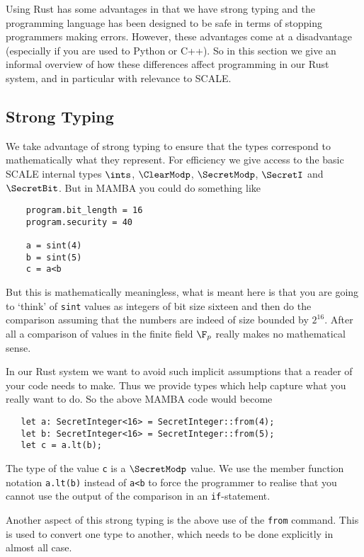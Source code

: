 Using Rust has some advantages in that we have strong typing and the
programming language has been designed to be safe in terms of stopping
programmers making errors.
However, these advantages come at a disadvantage (especially if you 
are used to Python or C++). 
So in this section we give an informal overview of how these differences
affect programming in our Rust system, and in particular with relevance
to SCALE.

\subsection{Strong Typing}
We take advantage of strong typing to ensure that the types correspond
to mathematically what they represent.
For efficiency we give access to the basic SCALE internal types
$\ints$, $\ClearModp$, $\SecretModp$, $\SecretI$ and $\SecretBit$.
But in MAMBA you could do something like
\begin{lstlisting}
    program.bit_length = 16
    program.security = 40

    a = sint(4)
    b = sint(5)
    c = a<b
\end{lstlisting}
But this is mathematically meaningless, what is meant here is that
you are going to `think' of \verb|sint| values as integers of bit
size sixteen and then do the comparison assuming that the numbers
are indeed of size bounded by $2^{16}$. After all a comparison
of values in the finite field $\F_p$ really makes no mathematical
sense.

In our Rust system we want to avoid such implicit assumptions
that a reader of your code needs to make. Thus we provide types
which help capture what you really want to do.
So the above MAMBA code would become
\begin{lstlisting}
   let a: SecretInteger<16> = SecretInteger::from(4);
   let b: SecretInteger<16> = SecretInteger::from(5);
   let c = a.lt(b);
\end{lstlisting}
The type of the value \verb|c| is a $\SecretModp$ value.
We use the member function notation \verb|a.lt(b)| instead
of \verb|a<b| to force the programmer to realise that you cannot
use the output of the comparison in an \verb|if|-statement.

Another aspect of this strong typing is the above use of the
\verb|from| command. This is used to convert one type to another,
which needs to be done explicitly in almost all case.

